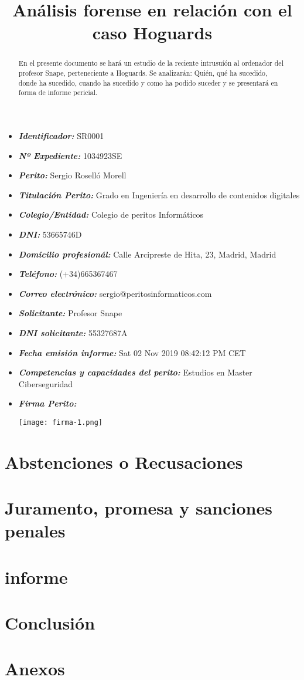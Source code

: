 \documentclass[a4paper,11pt]{article}
\title{{\Huge Análisis forense en relación con el caso Hoguards}}
\date{}
\begin{document}
\begin{titlepage}
\maketitle
  \begin{itemize}
    \item[] \textbf{\textit{Identificador:}} SR0001
    \item[] \textbf{\textit{Nº Expediente:}} 1034923SE
    \item[] \textbf{\textit{Perito:}} Sergio Roselló Morell
    \item[] \textbf{\textit{Titulación Perito:}} Grado en Ingeniería en desarrollo de contenidos digitales
    \item[] \textbf{\textit{Colegio/Entidad:}} Colegio de peritos Informáticos
    \item[] \textbf{\textit{DNI:}} 53665746D
    \item[] \textbf{\textit{Domicilio profesionál:}} Calle Arcipreste de Hita, 23, Madrid, Madrid
    \item[] \textbf{\textit{Teléfono:}} (+34)665367467
    \item[] \textbf{\textit{Correo electrónico:}} sergio@peritosinformaticos.com
    \item[] \textbf{\textit{Solicitante:}} Profesor Snape
    \item[] \textbf{\textit{DNI solicitante:}} 55327687A
    \item[] \textbf{\textit{Fecha emisión informe:}} Sat 02 Nov 2019 08:42:12 PM CET
    \item[] \textbf{\textit{Competencias y capacidades del perito:}} Estudios en Master Ciberseguridad
    \item[] \textbf{\textit{Firma Perito:}} 

      \texttt{[image: firma-1.png]}

  \end{itemize}
\end{titlepage}

\begin{abstract}
En el presente documento se hará un estudio de la reciente intrusuíón al ordenador del profesor Snape, perteneciente a Hoguards. Se analizarán: Quién, qué ha sucedido, donde ha sucedido, cuando ha sucedido y como ha podido suceder y se presentará en forma de informe pericial.
\end{abstract}


\section{Abstenciones o Recusaciones }

\section{Juramento, promesa y sanciones penales}

\clearpage
\tableofcontents
\clearpage
\section{informe}

\section{Conclusión}

\section{Anexos}

\end{document}
